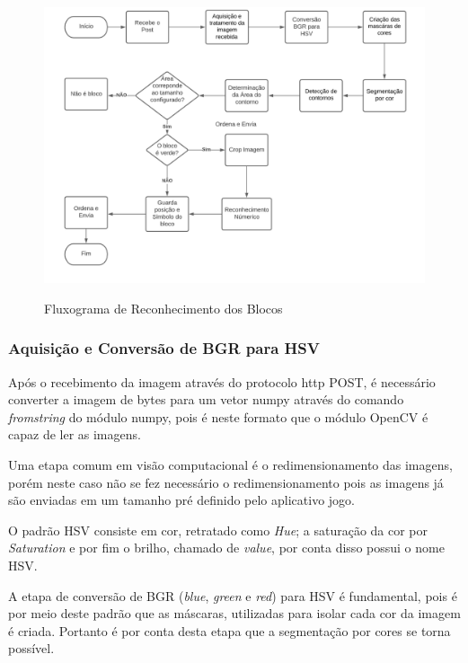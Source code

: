    \begin{figure}[H]
        \caption{Fluxograma de Reconhecimento dos Blocos}
        \centering
        \includegraphics[width=\linewidth]{Imagens/Cap4/fluxograma_reconhecimento.PNG}
        \label{figura:fluxo}
    \end{figure}

    \subsubsection{Aquisição e Conversão de BGR para HSV}
    
   Após o recebimento da imagem através do protocolo http POST, é necessário converter a imagem de bytes para um vetor numpy através do comando \textit{fromstring} do módulo numpy, pois é neste formato que o módulo OpenCV é capaz de ler as imagens. 

    Uma etapa comum em visão computacional é o redimensionamento  das imagens, porém neste caso não se fez necessário o redimensionamento pois as imagens já são enviadas em um tamanho pré definido pelo aplicativo jogo.
    
    O padrão HSV consiste em cor, retratado como \textit{Hue}; a saturação da cor por \textit{Saturation} e por fim o brilho, chamado de \textit{value}, por conta disso possui o nome HSV.
    
    A etapa de conversão de BGR (\textit{blue}, \textit{green} e \textit{red}) para HSV é fundamental, pois é por meio deste padrão que as máscaras, utilizadas para isolar cada cor da imagem é criada. Portanto é por conta desta etapa que a segmentação por cores se torna possível.

